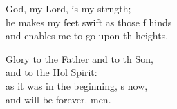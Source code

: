 \begin{psalmverse}
\begin{patverse}
God, my Lord, is my strngth;\Flex\\
he makes my feet swift as those f hinds\Med\\
and enables me to go upon th heights.

Glory to the Father and to th Son,\Med\\
and to the Hol Spirit:\\
as it was in the beginning, \pointup{\i}s now,\Med\\
and will be forever. men. 
  \end{patverse}
\end{psalmverse}
